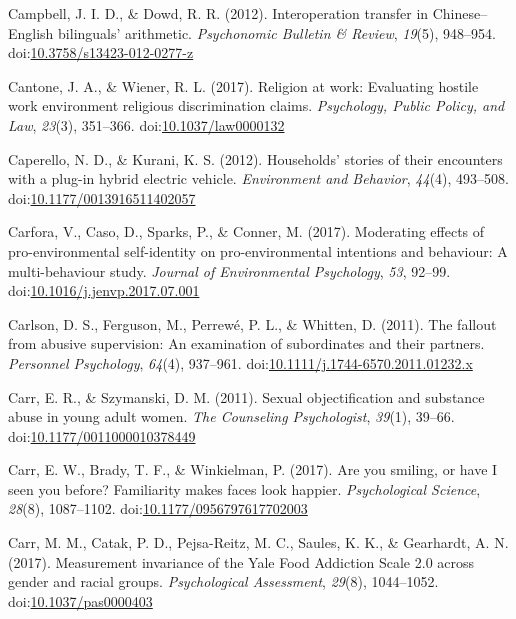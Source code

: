 \documentclass[english,man]{apa6}
\theoremstyle{definition}
\theoremstyle{definition}
\theoremstyle{definition}
\theoremstyle{remark}
\begin{document}
\hypertarget{ref-Campbell2012}{}
Campbell, J. I. D., \& Dowd, R. R. (2012). Interoperation transfer in
Chinese--English bilinguals' arithmetic. \emph{Psychonomic Bulletin \&
Review}, \emph{19}(5), 948--954.
doi:\href{https://doi.org/10.3758/s13423-012-0277-z}{10.3758/s13423-012-0277-z}

\hypertarget{ref-Cantone2017}{}
Cantone, J. A., \& Wiener, R. L. (2017). Religion at work: Evaluating
hostile work environment religious discrimination claims.
\emph{Psychology, Public Policy, and Law}, \emph{23}(3), 351--366.
doi:\href{https://doi.org/10.1037/law0000132}{10.1037/law0000132}

\hypertarget{ref-Caperello2012}{}
Caperello, N. D., \& Kurani, K. S. (2012). Households' stories of their
encounters with a plug-in hybrid electric vehicle. \emph{Environment and
Behavior}, \emph{44}(4), 493--508.
doi:\href{https://doi.org/10.1177/0013916511402057}{10.1177/0013916511402057}

\hypertarget{ref-Carfora2017}{}
Carfora, V., Caso, D., Sparks, P., \& Conner, M. (2017). Moderating
effects of pro-environmental self-identity on pro-environmental
intentions and behaviour: A multi-behaviour study. \emph{Journal of
Environmental Psychology}, \emph{53}, 92--99.
doi:\href{https://doi.org/10.1016/j.jenvp.2017.07.001}{10.1016/j.jenvp.2017.07.001}

\hypertarget{ref-Carlson2011}{}
Carlson, D. S., Ferguson, M., Perrewé, P. L., \& Whitten, D. (2011). The
fallout from abusive supervision: An examination of subordinates and
their partners. \emph{Personnel Psychology}, \emph{64}(4), 937--961.
doi:\href{https://doi.org/10.1111/j.1744-6570.2011.01232.x}{10.1111/j.1744-6570.2011.01232.x}

\hypertarget{ref-Carr2011a}{}
Carr, E. R., \& Szymanski, D. M. (2011). Sexual objectification and
substance abuse in young adult women. \emph{The Counseling
Psychologist}, \emph{39}(1), 39--66.
doi:\href{https://doi.org/10.1177/0011000010378449}{10.1177/0011000010378449}

\hypertarget{ref-Carr2017}{}
Carr, E. W., Brady, T. F., \& Winkielman, P. (2017). Are you smiling, or
have I seen you before? Familiarity makes faces look happier.
\emph{Psychological Science}, \emph{28}(8), 1087--1102.
doi:\href{https://doi.org/10.1177/0956797617702003}{10.1177/0956797617702003}

\hypertarget{ref-Carr2016}{}
Carr, M. M., Catak, P. D., Pejsa-Reitz, M. C., Saules, K. K., \&
Gearhardt, A. N. (2017). Measurement invariance of the Yale Food
Addiction Scale 2.0 across gender and racial groups. \emph{Psychological
Assessment}, \emph{29}(8), 1044--1052.
doi:\href{https://doi.org/10.1037/pas0000403}{10.1037/pas0000403}
\end{document}
